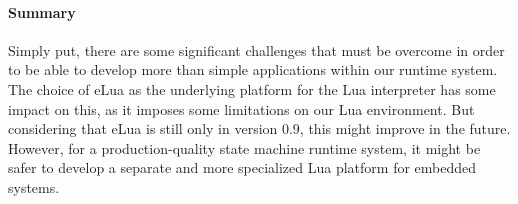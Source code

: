 \paragraph{Summary} Simply put, there are some significant challenges that must be overcome in order to be able to develop more than simple applications within our runtime system. The choice of eLua as the underlying platform for the Lua interpreter has some impact on this, as it imposes some limitations on our Lua environment. But considering that eLua is still only in version 0.9, this might improve in the future. However, for a production-quality state machine runtime system, it might be safer to develop a separate and more specialized Lua platform for embedded systems.
